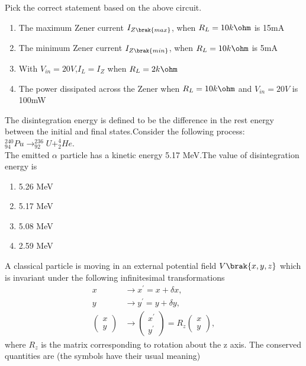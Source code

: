 Pick the correct statement based on the above circuit.
\begin{enumerate}
    \item The maximum Zener current $I_{Z\brak{max}}$, when $R_{L}=10k\ohm$ is 15mA
    \item The minimum Zener current $I_{Z\brak{min}}$, when $R_{L}=10k\ohm$ is 5mA
    \item With $V_{in}=20V$,$I_{L}=I_{Z}$ when $R_{L}=2k\ohm$
    \item The power dissipated across the Zener when $R_{L}=10k\ohm$ and $V_{in}=20V$ is 100mW
\end{enumerate}
\item The disintegration energy is defined to be the difference in the rest energy between the initial and final states.Consider the following process:\\$^{240}_{94}Pu\rightarrow ^{236}_{92}U+^{4}_{2}He$.\\The emitted $\alpha$ particle has a kinetic energy 5.17 MeV.The value of disintegration energy is
\begin{multicols}{4}
\begin{enumerate}
    \item 5.26 MeV
    \item 5.17 MeV
    \item 5.08 MeV
    \item 2.59 MeV
\end{enumerate}
\end{multicols}
\item A classical particle is moving in an external potential field $V\brak{x,y,z}$ which is invariant under the following infinitesimal transformations
\begin{align*}
x &\rightarrow x^{\prime} = x + \delta x,\\
y &\rightarrow y^{\prime} = y + \delta y,\\
\begin{pmatrix} x \\ y \end{pmatrix} &\rightarrow \begin{pmatrix} x^{\prime} \\ y^{\prime} \end{pmatrix}=R_{z}\begin{pmatrix} x \\ y \end{pmatrix},
\end{align*}
where $R_z$ is the matrix corresponding to rotation about the z axis. The conserved quantities are (the symbols have their usual meaning)
